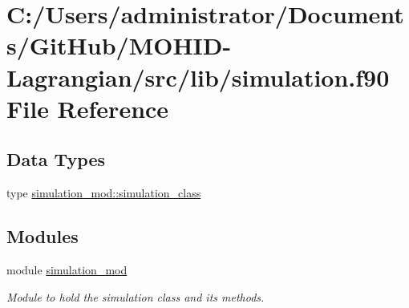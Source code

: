\hypertarget{simulation_8f90}{}\section{C\+:/\+Users/administrator/\+Documents/\+Git\+Hub/\+M\+O\+H\+I\+D-\/\+Lagrangian/src/lib/simulation.f90 File Reference}
\label{simulation_8f90}
\subsection*{Data Types}
\begin{DoxyCompactItemize}
\item 
type \mbox{\hyperlink{structsimulation__mod_1_1simulation__class}{simulation\+\_\+mod\+::simulation\+\_\+class}}
\end{DoxyCompactItemize}
\subsection*{Modules}
\begin{DoxyCompactItemize}
\item 
module \mbox{\hyperlink{namespacesimulation__mod}{simulation\+\_\+mod}}
\begin{DoxyCompactList}\small\item\em Module to hold the simulation class and its methods. \end{DoxyCompactList}\end{DoxyCompactItemize}

